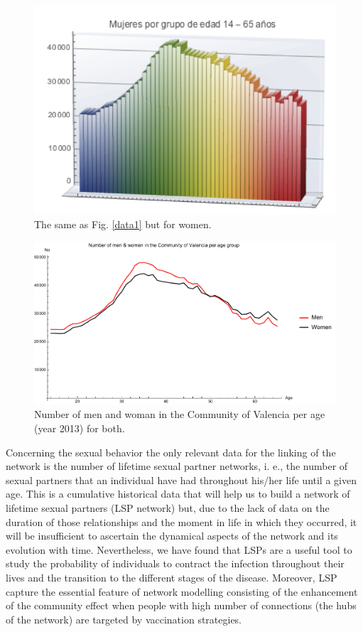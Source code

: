\begin{figure}[ht]
	\centering
	\includegraphics[scale=1.0]{IMG/data2.png}
	\caption{The same as Fig. \ref{data1} but for women.}
	\label{data2}
\end{figure} 

\begin{figure}[ht]
	\centering
	\includegraphics[scale=0.7]{demog.pdf}
	\caption{Number of men and woman in the Community of Valencia per age (year 2013) for both.}
	\label{demog}
\end{figure}

Concerning the sexual behavior the only relevant data for the linking of the network is the number of lifetime sexual partner networks, i. e., the number of sexual partners that an individual have had throughout his/her life until a given age. This is a cumulative historical data that will help us to build a network of lifetime sexual partners (LSP network) but, due to the lack of data on the duration of those relationships and the moment in life in which they occurred, it will be insufficient to ascertain the dynamical aspects of the network and its evolution with time. Nevertheless, we have found that LSPs are a useful tool to study the probability of individuals to contract the infection throughout their lives and the transition to the different stages of the disease. Moreover, LSP capture the essential feature of network modelling consisting of the enhancement of the community effect when people with high number of connections (the hubs of the network) are targeted by vaccination strategies.

